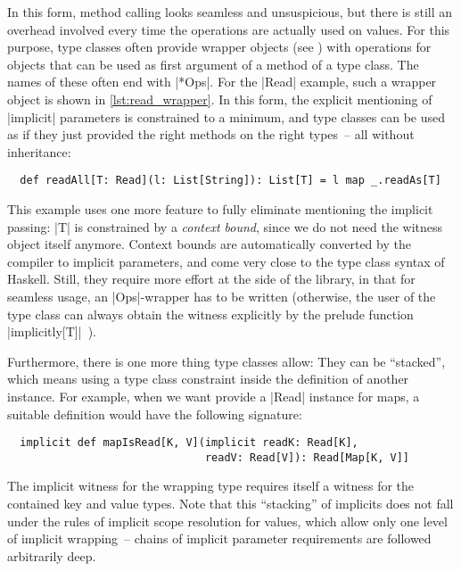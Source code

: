 In this form, method calling looks seamless and unsuspicious, but there is still an overhead
involved every time the operations are actually used on values. For this purpose, type classes often
provide wrapper objects (see ) with operations for objects that can be
used as first argument of a method of a type class. The names of these often end with |*Ops|. For
the |Read| example, such a wrapper object is shown in \autoref{lst:read_wrapper}. In this form, the
explicit mentioning of |implicit| parameters is constrained to a minimum, and type classes can be
used as if they just provided the right methods on the right types~-- all without inheritance:
\begin{lstlisting}
  def readAll[T: Read](l: List[String]): List[T] = l map _.readAs[T]
\end{lstlisting}
This example uses one more feature to fully eliminate mentioning the implicit passing: |T| is
constrained by a \emph{context bound}, since we do not need the witness object itself
anymore. Context bounds are automatically converted by the compiler to implicit parameters, and come
very close to the type class syntax of Haskell. Still, they require more effort at the side of the
library, in that for seamless usage, an |Ops|-wrapper has to be written (otherwise, the user of the
type class can always obtain the witness explicitly by the prelude function
|implicitly[T]|~\cite[][Chapter~12.5]{odersky2014:scala_spec}).\label{ops}

Furthermore, there is one more thing type classes allow: They can be \enquote{stacked}, which means
using a type class constraint inside the definition of another instance. For example, when we want
provide a |Read| instance for maps, a suitable definition would have the following signature:
\begin{lstlisting}
  implicit def mapIsRead[K, V](implicit readK: Read[K],
                               readV: Read[V]): Read[Map[K, V]]
\end{lstlisting}
The implicit witness for the wrapping type requires itself a witness for the contained key and value
types. Note that this \enquote{stacking} of implicits does not fall under the rules of implicit
scope resolution for values, which allow only one level of implicit wrapping~-- chains of implicit
parameter requirements are followed arbitrarily deep.

